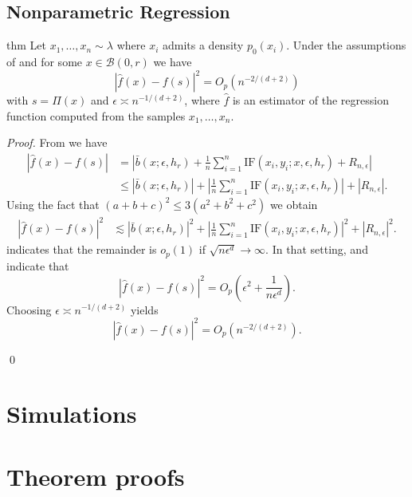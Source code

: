 \documentclass[11pt]{article}
\begin{document}
\subsection{Nonparametric Regression}

\begin{restatable}{thm}{} 
    Let $x_1, \dots, x_n \sim \lambda$ where $x_i$ admits a density $p_0(x_i)$. Under the assumptions of  and for some $x\in \mathcal{B}(0, r)$ we have
    \[\left|\hat{f}(x) - f(s)\right|^2 = O_p\left(n^{-2/(d+2)}\right) \]
    with $s = \Pi(x)$ and $\epsilon \asymp n^{-1/(d+2)}$, where $\hat{f}$ is an estimator of the regression function computed from the samples $x_1, \dots, x_n$.
\end{restatable}
\noindent \textit{Proof.} From  we have
\begin{align}
    \left|\hat{f}(x) - f(s)\right| &= \left|\bar{b}(x; \epsilon, h_r) + \frac{1}{n}\sum_{i = 1}^n\text{IF} (x_i, y_i; x, \epsilon, h_r) + R_{n, \epsilon}\right| \\ \label{eq: error decomposition with explicit remainder}
    &\leq\left|\bar{b}(x; \epsilon, h_r)\right| + \left|\frac{1}{n}\sum_{i = 1}^n\text{IF} (x_i, y_i; x, \epsilon, h_r)\right| + |R_{n, \epsilon}|.
\end{align}
Using the fact that $(a+b+c)^2 \leq 3(a^2 + b^2 + c^2)$ we obtain
\begin{align}
    \left|\hat{f}(x) - f(s)\right|^2 &\lesssim \left|\bar{b}(x; \epsilon, h_r)\right|^2 + \left|\frac{1}{n}\sum_{i = 1}^n\text{IF} (x_i, y_i; x, \epsilon, h_r)\right|^2 + |R_{n, \epsilon}|^2.
\end{align}
 indicates that the remainder is $o_p(1)$ if $\sqrt{n\epsilon^d} \rightarrow \infty$. In that setting,  and  indicate that
\[ \left|\hat{f}(x) - f(s)\right|^2 =  O_p\left(\epsilon^2 + \frac{1}{n\epsilon^d}\right).\]
Choosing $\epsilon \asymp n^{-1/(d+2)}$ yields
    \[\left|\hat{f}(x) - f(s)\right|^2 = O_p\left(n^{-2/(d+2)}\right). \]

\qed{}


\section{Simulations}


\section{Theorem proofs}
\end{document}
